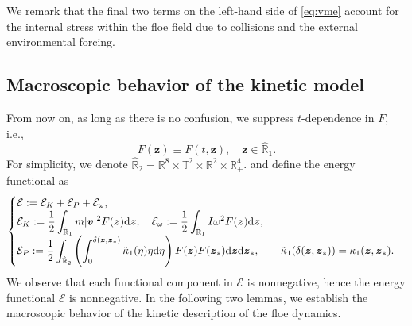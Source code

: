 \documentclass[a4paper,11pt]{article}
\numberwithin{equation}{section}
\theoremstyle{definition}
\newcommand{\bfz}{\boldsymbol{z}}
\newcommand{\bfv}{\boldsymbol{v}}
\newcommand{\bbr}{\mathbb R}
\def\d{{  \rm d}}
\newcommand{\E}{\mathcal{E}}
\begin{document}
\noindent
We remark that the final two terms on the left-hand side of \eqref{eq:vme} account for the internal stress within the floe field due to collisions and the external environmental forcing.


\subsection{Macroscopic behavior of the kinetic model}
From now on, as long as there is no confusion, we suppress $t$-dependence in $F$, i.e., 
\[ F(\bfz) \equiv  F(t, \bfz), \quad \bfz \in \hat{\bbr}_1.  \]
%
For simplicity, we denote $\hat{\bbr}_2 = \bbr^{8}\times \mathbb{T}^2\times \bbr^2 \times \bbr_+^{4}$. 
%
and define the energy functional as
\begin{equation*}  
\begin{cases} 
\displaystyle \E  := \E_K + \E_P + \E_{\omega}, \\
\displaystyle \E_K := \frac{1}{2} \int_{\hat{\bbr}_1} m|\bfv|^2 F(\bfz) \d \bfz, \quad \E_{\omega} := \frac{1}{2} \int_{\hat{\bbr}_1} I\omega^2 F(\bfz) \d \bfz, \\
\displaystyle \E_P  := \frac{1}{2}\int_{\hat{\bbr}_2} \left(\int_0^{\delta(\bfz,\bfz_*)} \tilde{\kappa}_1(\eta)\eta \d \eta \right)F(\bfz)F(\bfz_*) \d \bfz\d\bfz_*,\qquad \tilde{\kappa}_1(\delta(\bfz,\bfz_*))=\kappa_1(\bfz,\bfz_*).
\end{cases}
\end{equation*}
%
We observe that each functional component in $\E$ is nonnegative, hence the energy functional $\E$ is nonnegative. In the following two lemmas, we establish the macroscopic behavior of the kinetic description of the floe dynamics. 
%
%
\end{document}
